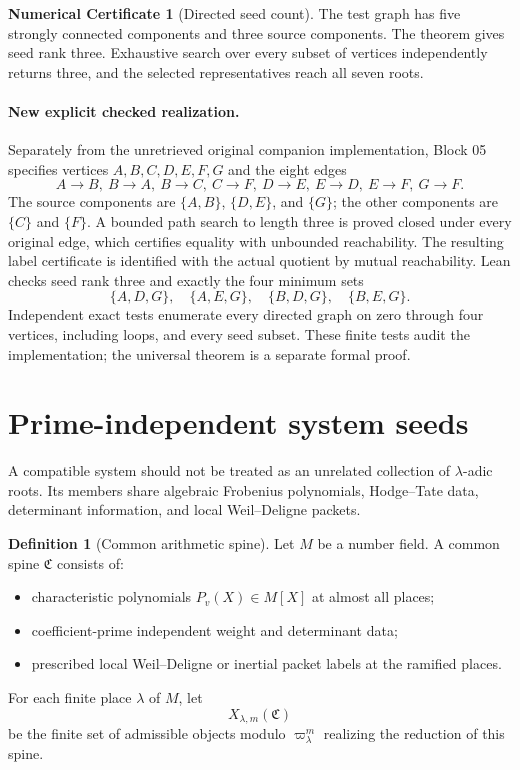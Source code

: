 \documentclass[11pt]{article}
\theoremstyle{definition}
\newtheorem{definition}[theorem]{Definition}
\newtheorem{numericalcertificate}[theorem]{Numerical Certificate}
\theoremstyle{remark}
\newcommand{\Compat}{\mathfrak C}
\begin{document}
\begin{numericalcertificate}[Directed seed count]
The test graph has five strongly connected components and three source components.  The theorem gives seed rank three.  Exhaustive search over every subset of vertices independently returns three, and the selected representatives reach all seven roots.

\paragraph{New explicit checked realization.}
Separately from the unretrieved original companion implementation, Block 05
specifies vertices $A,B,C,D,E,F,G$ and the eight edges
\[
 A\to B,\ B\to A,\ B\to C,\ C\to F,\ D\to E,\ E\to D,\ E\to F,\ G\to F.
\]
The source components are $\{A,B\}$, $\{D,E\}$, and $\{G\}$; the other
components are $\{C\}$ and $\{F\}$. A bounded path search to length three
is proved closed under every original edge, which certifies equality with
unbounded reachability. The resulting label certificate is identified with
the actual quotient by mutual reachability. Lean checks seed rank three and
exactly the four minimum sets
\[
 \{A,D,G\},\quad\{A,E,G\},\quad\{B,D,G\},\quad\{B,E,G\}.
\]
Independent exact tests enumerate every directed graph on zero through four
vertices, including loops, and every seed subset. These finite tests audit the
implementation; the universal theorem is a separate formal proof.

\end{numericalcertificate}

\section{Prime-independent system seeds}

A compatible system should not be treated as an unrelated collection of \(\lambda\)-adic roots.  Its members share algebraic Frobenius polynomials, Hodge--Tate data, determinant information, and local Weil--Deligne packets.

\begin{definition}[Common arithmetic spine]
Let \(M\) be a number field.  A common spine \(\Compat\) consists of:
\begin{itemize}
\item characteristic polynomials \(P_v(X)\in M[X]\) at almost all places;
\item coefficient-prime independent weight and determinant data;
\item prescribed local Weil--Deligne or inertial packet labels at the ramified places.
\end{itemize}
For each finite place \(\lambda\) of \(M\), let
\[
X_{\lambda,m}(\Compat)
\]
be the finite set of admissible objects modulo \(\varpi_\lambda^m\) realizing the reduction of this spine.
\end{definition}
\end{document}
